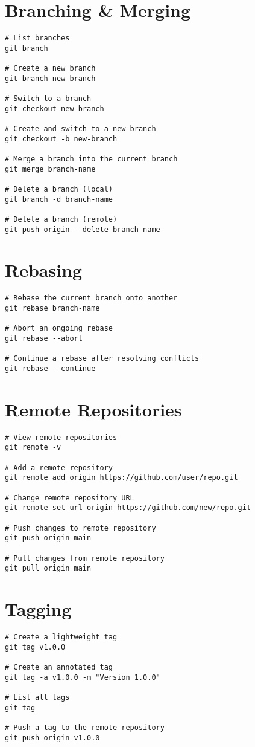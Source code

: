 \documentclass[11pt]{article}
\begin{document}
    \section*{Branching & Merging}
    \begin{lstlisting}[style=gitStyle]
# List branches
git branch

# Create a new branch
git branch new-branch

# Switch to a branch
git checkout new-branch

# Create and switch to a new branch
git checkout -b new-branch

# Merge a branch into the current branch
git merge branch-name

# Delete a branch (local)
git branch -d branch-name

# Delete a branch (remote)
git push origin --delete branch-name
    \end{lstlisting}

    \section*{Rebasing}
    \begin{lstlisting}[style=gitStyle]
# Rebase the current branch onto another
git rebase branch-name

# Abort an ongoing rebase
git rebase --abort

# Continue a rebase after resolving conflicts
git rebase --continue
    \end{lstlisting}

    \section*{Remote Repositories}
    \begin{lstlisting}[style=gitStyle]
# View remote repositories
git remote -v

# Add a remote repository
git remote add origin https://github.com/user/repo.git

# Change remote repository URL
git remote set-url origin https://github.com/new/repo.git

# Push changes to remote repository
git push origin main

# Pull changes from remote repository
git pull origin main
    \end{lstlisting}

    \section*{Tagging}
    \begin{lstlisting}[style=gitStyle]
# Create a lightweight tag
git tag v1.0.0

# Create an annotated tag
git tag -a v1.0.0 -m "Version 1.0.0"

# List all tags
git tag

# Push a tag to the remote repository
git push origin v1.0.0
    \end{lstlisting}
\end{document}
